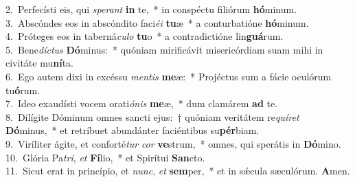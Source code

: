 {2.~}Perfecísti eis, qui \textit{spe}\textit{rant} \textbf{in} te,~* in conspéctu filiórum \textbf{hó}minum.\\
{3.~}Abscóndes eos in abscóndito faci\textit{é}\textit{i} \textbf{tu}æ~* a conturbatióne \textbf{hó}minum.\\
{4.~}Próteges eos in taberná\textit{cu}\textit{lo} \textbf{tu}o~* a contradictióne lin\textbf{guá}rum.\\
{5.~}Bene\textit{dí}\textit{ctus} \textbf{Dó}minus:~* quóniam mirificávit misericórdiam suam mihi in civitáte mu\textbf{ní}ta.\\
{6.~}Ego autem dixi in excéssu \textit{men}\textit{tis} \textbf{me}æ:~* Projéctus sum a fácie oculórum tu\textbf{ó}rum.\\
{7.~}Ideo exaudísti vocem orati\textit{ó}\textit{nis} \textbf{me}æ,~* dum clamárem \textbf{ad} te.\\
{8.~}Dilígite Dóminum omnes sancti ejus:~† quóniam veritátem re\textit{quí}\textit{ret} \textbf{Dó}minus,~* et retríbuet abundánter faciéntibus su\textbf{pér}biam.\\
{9.~}Viríliter ágite, et conforté\textit{tur} \textit{cor} \textbf{ve}strum,~* omnes, qui sperátis in \textbf{Dó}mino.\\
{10.~}Glória Pa\textit{tri}, \textit{et} \textbf{Fí}lio,~* et Spirítui \textbf{San}cto.\\
{11.~}Sicut erat in princípio, et \textit{nunc}, \textit{et} \textbf{sem}per,~* et in sǽcula sæculórum. \textbf{A}men.\\
